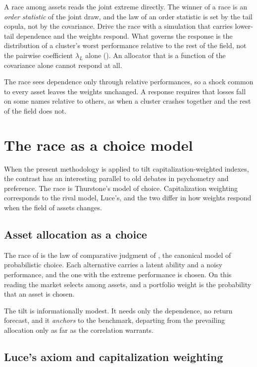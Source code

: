 A race among assets reads the joint extreme directly. The winner of a race is an
\emph{order statistic} of the joint draw, and the law of an order statistic is set
by the tail copula, not by the covariance. Drive the race with a
simulation that carries lower-tail dependence and the weights respond. What governs
the response is the distribution of a cluster's worst performance relative to the
rest of the field, not the pairwise coefficient $\lambda_L$ alone
(). An allocator that is a function of the
covariance alone cannot respond at all.

The race sees dependence only through relative performances, so a shock common to
every asset leaves the weights unchanged. A response requires that losses fall on
some names relative to others, as when a cluster crashes together and the rest of
the field does not.


\section{The race as a choice model}
\label{sec:choicemodel}

When the present methodology is applied to tilt capitalization-weighted indexes,
the contrast has an interesting parallel to old debates in psychometry and
preference. The race is Thurstone's model of choice. Capitalization weighting
corresponds to the rival model, Luce's, and the two differ in how weights respond
when the field of assets changes.

\subsection{Asset allocation as a choice}
\label{sec:choice}

The race of  is the law of comparative judgment of
\textcite{thurstone1927}, the canonical model of probabilistic choice. Each
alternative carries a latent ability and a noisy performance, and the one with the
extreme performance is chosen. On this reading the market selects among assets, and
a portfolio weight is the probability that an asset is chosen.

The tilt is informationally modest. It needs only the dependence, no return
forecast, and it \emph{anchors} to the benchmark, departing from the prevailing
allocation only as far as the correlation warrants.

\subsection{Luce's axiom and capitalization weighting}
\label{sec:luce}

